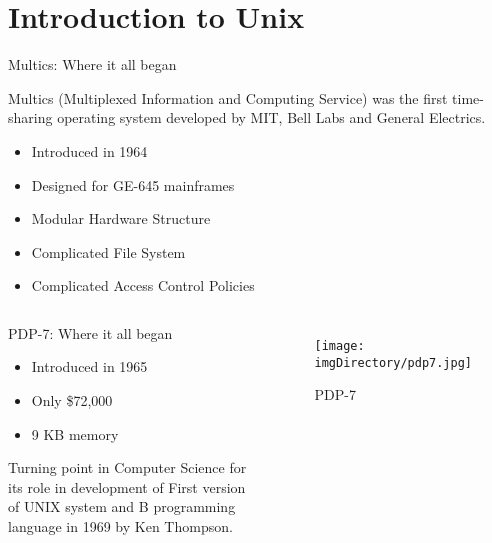 \documentclass[compress]{beamer}
\begin{document}
\prepareCover

\section{Introduction to Unix}

\begin{slide}
	\begin{block}{Multics: Where it all began}

	Multics (Multiplexed Information and Computing Service) was the first time-sharing operating system developed by MIT, Bell Labs and General Electrics.

	\begin{itemize}
	\item[] Introduced in 1964
	\item[] Designed for GE-645 mainframes
	\item[] Modular Hardware Structure
	\item[] Complicated File System
	\item[] Complicated Access Control Policies
	\end{itemize}

	\end{block}
\end{slide}

\begin{slide}
	\begin{columns}

	\begin{block}{PDP-7: Where it all began}

	\begin{itemize}
	\item[] Introduced in 1965
	\item[] Only \$72,000
	\item[] 9 KB memory
	\end{itemize}

	Turning point in Computer Science for its role in development of First version of UNIX system and B programming language in 1969 by Ken Thompson.

	\end{block}

	\begin{figure}
	\texttt{[image: \\imgDirectory/pdp7.jpg]}
	\caption{PDP-7}
	\end{figure}

	\end{columns}
\end{slide}
\end{document}
